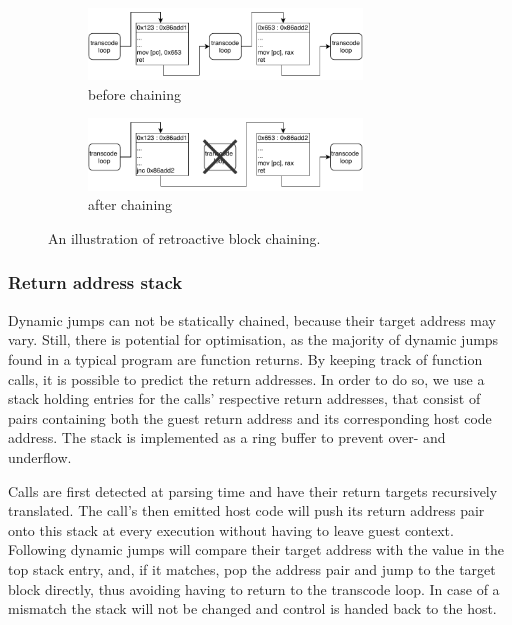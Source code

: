 \begin{figure}[h]
	\begin{center}
		\begin{subfigure}[b]{\textwidth}
			\centering
			\includegraphics[width=0.8\textwidth]{media/chaining-unchained.pdf}
			\caption{before chaining}
		\end{subfigure}
		\begin{subfigure}[b]{\textwidth}
			\centering
			\includegraphics[width=0.8\textwidth]{media/chaining-chained.pdf}
			\caption{after chaining}
		\end{subfigure}
	\end{center}
	
	\caption[Block chaining illustration]%
	{An illustration of retroactive block chaining.}
\end{figure}


\subsubsection{Return address stack}
\label{sec:return-address-stack}
Dynamic jumps can not be statically chained, because their target address may vary.
Still, there is potential for optimisation, as the majority of dynamic jumps found in a typical program are function returns.
By keeping track of function calls, it is possible to predict the return addresses.
In order to do so, we use a stack holding entries for the calls' respective return addresses, that consist of pairs containing both the guest return address and its corresponding host code address.
The stack is implemented as a ring buffer to prevent over- and underflow.

Calls are first detected at parsing time and have their return targets recursively translated.
The call's then emitted host code will push its return address pair onto this stack at every execution without having to leave guest context.
Following dynamic jumps will compare their target address with the value in the top stack entry, and, if it matches, pop the address pair and jump to the target block directly, thus avoiding having to return to the transcode loop.
In case of a mismatch the stack will not be changed and control is handed back to the host.


